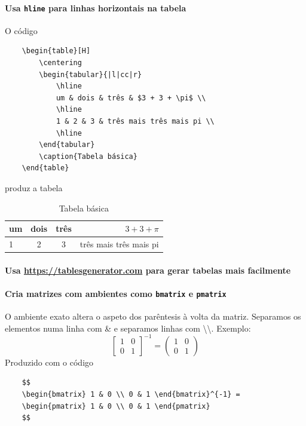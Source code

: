 \documentclass[11pt]{article}
\begin{document}
\paragraph{Usa \texttt{hline} para linhas horizontais na tabela}
O código
\begin{verbatim}
    \begin{table}[H]
        \centering
        \begin{tabular}{|l|cc|r}
            \hline
            um & dois & três & $3 + 3 + \pi$ \\
            \hline
            1 & 2 & 3 & três mais três mais pi \\
            \hline
        \end{tabular}
        \caption{Tabela básica}
    \end{table}
\end{verbatim}
produz a tabela
\begin{table}[H]
    \centering
    \begin{tabular}{|l|cc|r}
        \hline
        um & dois & três & $3 + 3 + \pi$ \\
        \hline
        1 & 2 & 3 & três mais três mais pi \\
        \hline
    \end{tabular}
    \caption{Tabela básica}
\end{table}

\paragraph{Usa \url{https://tablesgenerator.com} para gerar tabelas mais facilmente}

\paragraph{Cria matrizes com ambientes como \texttt{bmatrix} e \texttt{pmatrix}}
O ambiente exato altera o aspeto dos parêntesis à volta da matriz.
Separamos os elementos numa linha com \& e separamos linhas com
\textbackslash\textbackslash.
Exemplo:
$$
\begin{bmatrix} 1 & 0 \\ 0 & 1 \end{bmatrix}^{-1} = 
\begin{pmatrix} 1 & 0 \\ 0 & 1 \end{pmatrix}
$$
Produzido com o código
\begin{verbatim}
    $$
    \begin{bmatrix} 1 & 0 \\ 0 & 1 \end{bmatrix}^{-1} = 
    \begin{pmatrix} 1 & 0 \\ 0 & 1 \end{pmatrix}
    $$
\end{verbatim}
\end{document}
